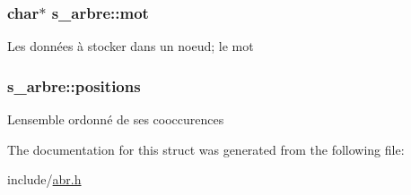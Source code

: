 \subsubsection[{\texorpdfstring{mot}{mot}}]{\setlength{\rightskip}{0pt plus 5cm}char$\ast$ s\+\_\+arbre\+::mot}\hypertarget{structs__arbre_a7853fb86d241c6569f3449e6589f3c8a}{}\label{structs__arbre_a7853fb86d241c6569f3449e6589f3c8a}
Les données à stocker dans un noeud; le mot 
\subsubsection[{\texorpdfstring{positions}{positions}}]{ s\+\_\+arbre\+::positions}\hypertarget{structs__arbre_af3754e685aace8398941e5a09190201c}{}\label{structs__arbre_af3754e685aace8398941e5a09190201c}
L\textquotesingle{}ensemble ordonné de ses cooccurences 

The documentation for this struct was generated from the following file\+:\begin{DoxyCompactItemize}
\item 
include/\hyperlink{abr_8h}{abr.\+h}\end{DoxyCompactItemize}

